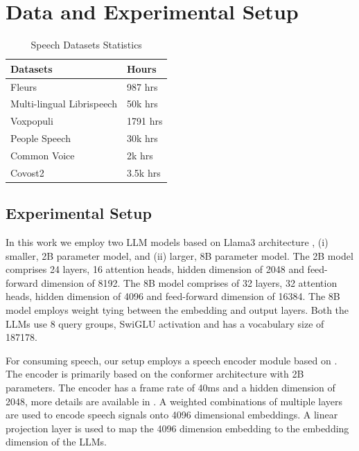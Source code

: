 \documentclass[conference]{IEEEtran}
\begin{document}
\section{Data and Experimental Setup}\label{sec:setup}
\begin{table}[!b]
    \centering
    \caption{Speech Datasets Statistics}
    \label{table:data}
    \begin{tabularx}{0.8\columnwidth}{@{} p{} L @{}} %
        \toprule
        \textbf{Datasets} & \textbf{Hours} \\
        \midrule
        Fleurs \cite{conneau2023fleurs} & 987 hrs \\
        Multi-lingual Librispeech \cite{pratap2020mls} & 50k hrs \\
        Voxpopuli \cite{wang2021voxpopuli} & 1791 hrs \\
        People Speech \cite{galvez2021people} & 30k hrs  \\
        Common Voice \cite{ardila2019common} & 2k hrs \\
        Covost2 \cite{wang2020covost} & 3.5k hrs \\
        \bottomrule
    \end{tabularx}
\end{table}

\subsection{Experimental Setup}
In this work we employ two LLM models based on Llama3 architecture \cite{grattafiori2024llama}, (i) smaller, 2B parameter model, and (ii) larger, 8B parameter model.
The 2B model comprises 24 layers, 16 attention heads, hidden dimension of 2048 and feed-forward dimension of 8192.
The 8B model comprises of 32 layers, 32 attention heads, hidden dimension of 4096 and feed-forward dimension of 16384.
The 8B model employs weight tying between the embedding and output layers.
Both the LLMs use 8 query groups, SwiGLU activation and has a vocabulary size of 187178.

For consuming speech, our setup employs a speech encoder module based on \cite{male2025durepdualmodespeechrepresentation}.
The encoder is primarily based on the conformer architecture with 2B parameters.
The encoder has a frame rate of 40ms and a hidden dimension of 2048, more details are available in \cite{male2025durepdualmodespeechrepresentation}.
A weighted combinations of multiple layers are used to encode speech signals onto 4096 dimensional embeddings.
A linear projection layer is used to map the 4096 dimension embedding to the embedding dimension of the LLMs.
\end{document}

